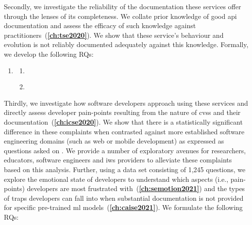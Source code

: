 Secondly, we investigate the reliability of the documentation these services offer through the lenses of its completeness. We collate prior knowledge of good \gls{api} documentation and assess the efficacy of such knowledge against practitioners~(\textbf{\cref{ch:tse2020}}). We show that these service's behaviour and evolution is not reliably documented adequately against this knowledge. Formally, we develop the following RQs:

\begin{leftbar}
\begin{enumerate}[label=\faQuestionCircle~~\textbf{RQ\arabic*.}, ref=RQ\arabic*, leftmargin=2.5\parindent, rightmargin=1\parindent,start=2]
    \item \textbf{\RQTwoTextDocumentation{}}\label{rq:docs}
    \begin{enumerate}[label=\textit{RQ2.\arabic*.}, ref=RQ2.\arabic*]
      \item \RQTwoTextDocumentationWhatIsCompleteDocs{} \label{rq:docs:complete}
      \item \RQTwoTextDocumentationMissingAttributes{} \label{rq:docs:missing}
    \end{enumerate}
\end{enumerate}
\end{leftbar}

Thirdly, we investigate how software developers approach using these services and directly assess developer pain-points resulting from the nature of \glspl{cvs} and their documentation~(\textbf{\cref{ch:icse2020}}). We show that there is a statistically significant difference in these complaints when contrasted against more established software engineering domains (such as web or mobile development) as expressed as questions asked on . We provide a number of exploratory avenues for researchers, educators, software engineers and \gls{iws} providers to alleviate these complaints based on this analysis. Further, using a data set consisting of 1,245  questions, we explore the emotional state of developers to understand which aspects (i.e., pain-points) developers are most frustrated with~(\textbf{\cref{ch:semotion2021}}) and the types of traps developers can fall into when substantial documentation is not provided for specific pre-trained \gls{ml} models~(\textbf{\cref{ch:caise2021}}). We formulate the following RQs:

